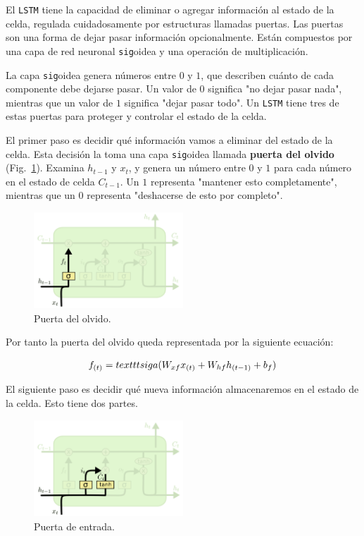 \documentclass[a4paper,12pt]{article}
\begin{document}
El \texttt{LSTM} tiene la capacidad de eliminar o agregar información al estado de la celda, regulada cuidadosamente por estructuras llamadas puertas. Las puertas son una forma de dejar pasar información opcionalmente. Están compuestos por una capa de red neuronal \texttt{sig}oidea y una operación de multiplicación.

La capa \texttt{sig}oidea genera números entre $0$ y $1$, que describen cuánto de cada componente debe dejarse pasar. Un valor de $0$ significa "no dejar pasar nada", mientras que un valor de $1$ significa "dejar pasar todo". Un \texttt{LSTM} tiene tres de estas puertas para proteger y controlar el estado de la celda.

El primer paso es decidir qué información vamos a eliminar del estado de la celda. Esta decisión la toma una capa \texttt{sig}oidea llamada \textbf{puerta del olvido} (Fig.~\ref{fig:lstm2}). Examina $h_{t-1}$ y $x_t$, y genera un número entre $0$ y $1$ para cada número en el estado de celda $C_{t-1}$. Un $1$ representa "mantener esto completamente", mientras que un $0$ representa "deshacerse de esto por completo".

\begin{figure}[H]
	\begin{center}				
	\includegraphics[width=0.5\textwidth]{lstm2.png}
  	\caption{Puerta del olvido.}
  	\label{fig:lstm2}
  	\end{center}
\end{figure}

Por tanto la puerta del olvido queda representada por la siguiente ecuación:

$$f_{(t)} = \\texttt{sig}a (W_{xf}x_{(t)} + W_{hf}h_{(t-1)} + b_f)$$

El siguiente paso es decidir qué nueva información almacenaremos en el estado de la celda. Esto tiene dos partes. 

\begin{figure}[H]
	\begin{center}				
	\includegraphics[width=0.5\textwidth]{lstm3.png}
  	\caption{Puerta de entrada.}
  	\label{fig:lstm3}
  	\end{center}
\end{figure}
\end{document}
